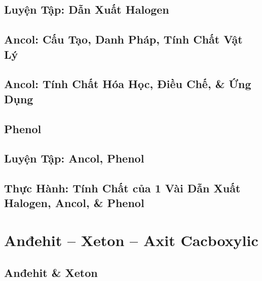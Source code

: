 \documentclass[oneside]{book}
\numberwithin{equation}{section}
\begin{document}

\section{Luyện Tập: Dẫn Xuất Halogen}


\section{Ancol: Cấu Tạo, Danh Pháp, Tính Chất Vật Lý}


\section{Ancol: Tính Chất Hóa Học, Điều Chế, \& Ứng Dụng}


\section{Phenol}


\section{Luyện Tập: Ancol, Phenol}


\section{Thực Hành: Tính Chất của 1 Vài Dẫn Xuất Halogen, Ancol, \& Phenol}


\chapter{Anđehit -- Xeton -- Axit Cacboxylic}

\section{Anđehit \& Xeton}
\end{document}
